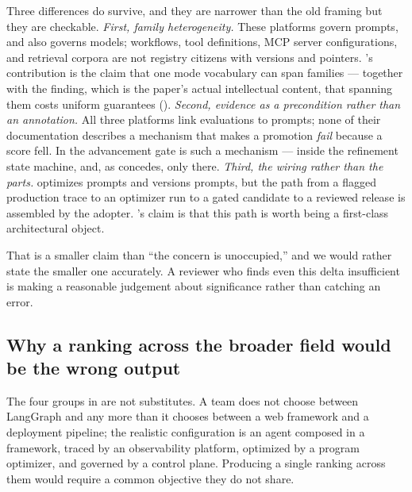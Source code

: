  Three differences do survive, and they are narrower than the
old framing but they are checkable. \emph{First, family heterogeneity.} These
platforms govern prompts, and \mlflow{} also governs models; workflows, tool
definitions, MCP server configurations, and retrieval corpora are not registry
citizens with versions and pointers. \sys's contribution is the claim that one
mode vocabulary can span \statFamiliesW{} families --- together with the finding,
which is the paper's actual intellectual content, that spanning them costs uniform
guarantees (). \emph{Second, evidence as a precondition
rather than an annotation.} All three platforms link evaluations to prompts; none
of their documentation describes a mechanism that makes a promotion \emph{fail}
because a score fell. In \sys the advancement gate is such a mechanism --- inside
the refinement state machine, and, as  concedes, only
there. \emph{Third, the wiring rather than the parts.} \mlflow{} optimizes
prompts and \mlflow{} versions prompts, but the path from a flagged production
trace to an optimizer run to a gated candidate to a reviewed release is assembled
by the adopter. \sys's claim is that this path is worth being a first-class
architectural object.

That is a smaller claim than ``the concern is unoccupied,'' and we would rather
state the smaller one accurately. A reviewer who finds even this delta insufficient
is making a reasonable judgement about significance rather than catching an error.

\subsection{Why a ranking across the broader field would be the wrong output}

The four groups in  are not substitutes. A team does not choose
between LangGraph and \sys any more than it chooses between a web framework and a
deployment pipeline; the realistic configuration is an agent composed in a framework,
traced by an observability platform, optimized by a program optimizer, and governed
by a control plane. Producing a single ranking across them would require a common
objective they do not share.


